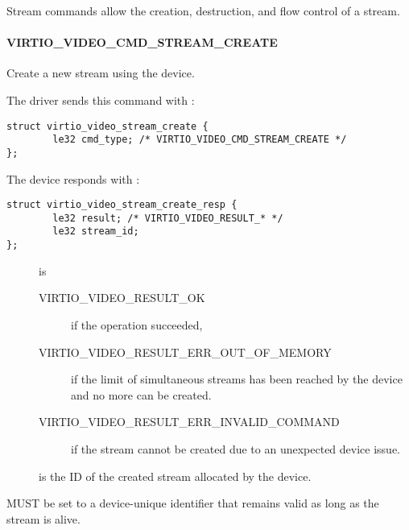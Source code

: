 Stream commands allow the creation, destruction, and flow control of a
stream.

\paragraph{VIRTIO_VIDEO_CMD_STREAM_CREATE}\label{sec:Device Types / Video Device / Device Operation / Device Operation: Stream commands / VIRTIO_VIDEO_CMD_STREAM_CREATE}

Create a new stream using the device.

The driver sends this command with
:

\begin{lstlisting}
struct virtio_video_stream_create {
        le32 cmd_type; /* VIRTIO_VIDEO_CMD_STREAM_CREATE */
};
\end{lstlisting}

The device responds with :

\begin{lstlisting}
struct virtio_video_stream_create_resp {
        le32 result; /* VIRTIO_VIDEO_RESULT_* */
        le32 stream_id;
};
\end{lstlisting}

\begin{description}
\item[]
is

\begin{description}
\item[VIRTIO\_VIDEO\_RESULT\_OK]
if the operation succeeded,
\item[VIRTIO\_VIDEO\_RESULT\_ERR\_OUT\_OF\_MEMORY]
if the limit of simultaneous streams has been reached by the device and
no more can be created.
\item[VIRTIO\_VIDEO\_RESULT\_ERR\_INVALID\_COMMAND]
if the stream cannot be created due to an unexpected device issue.
\end{description}
\item[]
is the ID of the created stream allocated by the device.
\end{description}


 MUST be set to a device-unique identifier that remains
valid as long as the stream is alive.

